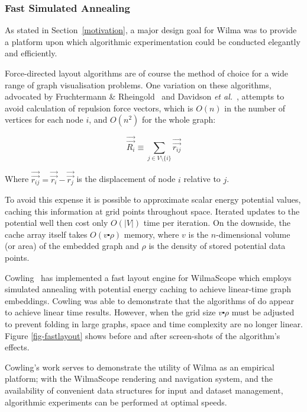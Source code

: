 \documentclass[runningheads]{cl2emult}
\newcommand{\avec}[1]{\vec{\overrightarrow{ #1}}}
\begin{document}
\subsubsection{Fast Simulated Annealing}

As stated in Section~\ref{motivation}, a major design goal for Wilma
was to provide a platform upon which algorithmic experimentation could be
conducted elegantly and efficiently.

Force-directed layout algorithms are of course the method of choice for a
wide range of graph visualisation problems.  One variation on these
algorithms, advocated by Fruchtermann \&
Rheingold~\cite{fruchtermann90force-directed} and Davidson {\em et
al.}~\cite{davidson01noise}, attempts to avoid calculation of repulsion force
vectors, which is $O(n)$ in the number of vertices for each node $i$, and
$O(n^2)$ for the whole graph:

\begin{equation}
\label{repulsion}
\avec{R_i} \equiv \sum_{j \in V \setminus \{i\}} \avec{r_{ij}}
\end{equation}

\noindent Where $\avec{r_{ij}} = \avec{r_i} - \avec{r_j}$ is the displacement
of node $i$ relative to $j$.

To avoid this expense it is possible to approximate scalar energy potential
values, caching this information at grid points throughout space.  Iterated
updates to the potential well then cost only $O(|V|)$ time per iteration.  On
the downside, the cache array itself takes $O(v \centerdot \rho)$ memory,
where $v$ is the $n$-dimensional volume (or area) of the embedded graph and
$\rho$ is the density of stored potential data points.

Cowling~\cite{cowling02fast} has implemented a fast layout engine for
WilmaScope which employs simulated annealing with potential energy caching to
achieve linear-time graph embeddings.  Cowling was able to demonstrate that
the algorithms of \cite{davidson01noise} do appear to achieve linear time
results.  However, when the grid size $v \centerdot \rho$ must be adjusted to
prevent folding in large graphs, space and time complexity are no longer
linear.  Figure \ref{fig-fastlayout} shows before and after screen-shots of
the algorithm's effects.

Cowling's work serves to demonstrate the utility of Wilma as an empirical
platform; with the WilmaScope rendering and navigation system, and the
availability of convenient data structures for input and dataset management,
algorithmic experiments can be performed at optimal speeds.
\end{document}
